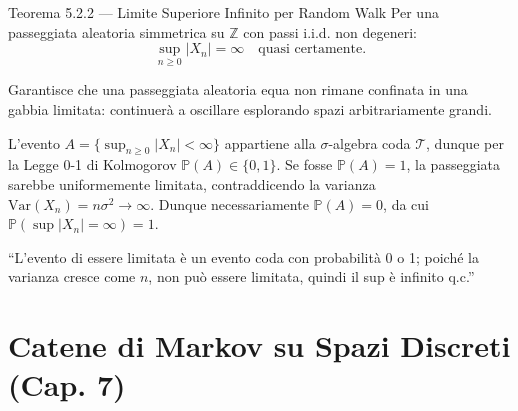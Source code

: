 \documentclass[11pt,a4paper]{report}
\begin{document}
\begin{teoremabox}{Teorema 5.2.2 --- Limite Superiore Infinito per Random Walk}
Per una passeggiata aleatoria simmetrica su $\mathbb{Z}$ con passi i.i.d. non degeneri:
\[
\sup_{n \ge 0} |X_n| = \infty \quad \text{quasi certamente}.
\]

\begin{cosafa}
Garantisce che una passeggiata aleatoria equa non rimane confinata in una gabbia limitata: continuerà a oscillare esplorando spazi arbitrariamente grandi.
\end{cosafa}

\begin{dimostrazione}
L'evento $A = \{\sup_{n \ge 0} |X_n| < \infty\}$ appartiene alla $\sigma$-algebra coda $\mathcal{T}$, dunque per la Legge 0-1 di Kolmogorov $\mathbb{P}(A) \in \{0,1\}$. Se fosse $\mathbb{P}(A) = 1$, la passeggiata sarebbe uniformemente limitata, contraddicendo la varianza $\mathrm{Var}(X_n) = n\sigma^2 \to \infty$. Dunque necessariamente $\mathbb{P}(A) = 0$, da cui $\mathbb{P}(\sup |X_n| = \infty) = 1$.
\end{dimostrazione}

\begin{oralbox}
``L'evento di essere limitata è un evento coda con probabilità 0 o 1; poiché la varianza cresce come $n$, non può essere limitata, quindi il sup è infinito q.c.''
\end{oralbox}
\end{teoremabox}

\newpage

\chapter{Catene di Markov su Spazi Discreti (Cap. 7)}
\end{document}
